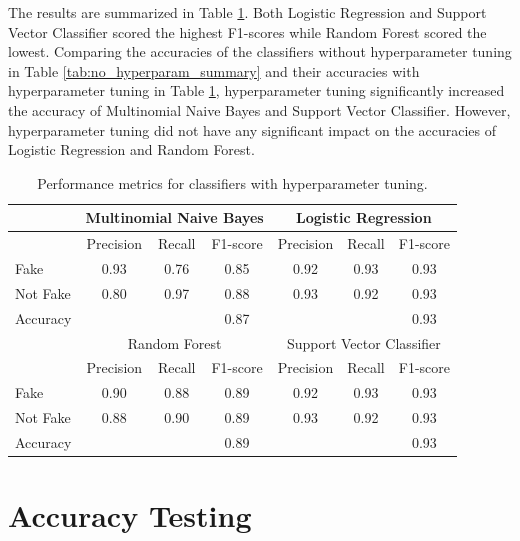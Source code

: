 The results are summarized in Table \ref{tab:hyperparam_summary}. Both Logistic Regression and Support Vector Classifier scored the highest F1-scores while Random Forest scored the lowest. Comparing the accuracies of the classifiers without hyperparameter tuning in Table \ref{tab:no_hyperparam_summary} and their accuracies with hyperparameter tuning in Table \ref{tab:hyperparam_summary}, hyperparameter tuning significantly increased the accuracy of Multinomial Naive Bayes and Support Vector Classifier. However, hyperparameter tuning did not have any significant impact on the accuracies of Logistic Regression and Random Forest.

\begin{table}[ht]
    \centering
    \begin{tabular}{|l|ccc|ccc|}
    \hline
    & \multicolumn{3}{c|}{Multinomial Naive Bayes} & \multicolumn{3}{c|}{Logistic Regression} \\
    \hline
    & Precision & Recall & F1-score & Precision & Recall & F1-score \\
    \hline
    Fake & 0.93 & 0.76 & 0.85 & 0.92 & 0.93 & 0.93 \\
    Not Fake & 0.80 & 0.97 & 0.88 & 0.93 & 0.92 & 0.93 \\
    Accuracy & & & 0.87 & & & 0.93 \\
    \hline
    & \multicolumn{3}{c|}{Random Forest} & \multicolumn{3}{c|}{Support Vector Classifier} \\
    \hline
    & Precision & Recall & F1-score & Precision & Recall & F1-score \\
    \hline
    Fake & 0.90 & 0.88 & 0.89 & 0.92 & 0.93 & 0.93 \\
    Not Fake & 0.88 & 0.90 & 0.89 & 0.93 & 0.92 & 0.93 \\
    Accuracy & & & 0.89 & & & 0.93 \\
    \hline
    \end{tabular}
    \caption{Performance metrics for classifiers with hyperparameter tuning.}
    \label{tab:hyperparam_summary}
\end{table}
    
\section{Accuracy Testing}

